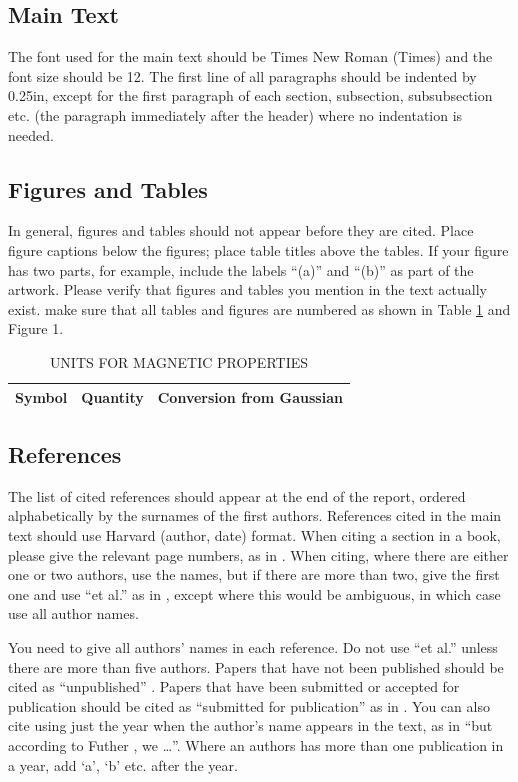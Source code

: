 \documentclass[12pt,a4paper]{article}
\begin{document}
\subsection{Main Text}

The font used for the main text should be Times New Roman (Times) and the font size should be 12.  The first line of all paragraphs should be indented by 0.25in, except for the first paragraph of each section, subsection, subsubsection etc. (the paragraph immediately after the header) where no indentation is needed.

\subsection{Figures and Tables}
In general, figures and tables should not appear before they are cited.  Place figure captions below the figures; place table titles above the tables.  If your figure has two parts, for example, include the labels ``(a)'' and ``(b)'' as part of the artwork.  Please verify that figures and tables you mention in the text actually exist.  make sure that all tables and figures are numbered as shown in Table \ref{units} and Figure 1.

\begin{table}[htb]
\centering
\caption{UNITS FOR MAGNETIC PROPERTIES}
\vspace*{6pt}
\label{units}
\begin{tabular}{ccc}\hline\hline
Symbol & Quantity & Conversion from Gaussian \\ \hline
\end{tabular}
\end{table}

\subsection{References}

The list of cited references should appear at the end of the report, ordered alphabetically by the surnames of the first authors.  References cited in the main text should use Harvard (author, date) format.  When citing a section in a book, please give the relevant page numbers, as in \cite[p293]{budgen}.  When citing, where there are either one or two authors, use the names, but if there are more than two, give the first one and use ``et al.'' as in  , except where this would be ambiguous, in which case use all author names.

You need to give all authors' names in each reference.  Do not use ``et al.'' unless there are more than five authors.  Papers that have not been published should be cited as ``unpublished'' \cite{euther}.  Papers that have been submitted or accepted for publication should be cited as ``submitted for publication'' as in \cite{futher} .  You can also cite using just the year when the author's name appears in the text, as in ``but according to Futher \citeyear{futher}, we \dots''.  Where an authors has more than one publication in a year, add `a', `b' etc. after the year.
\end{document}
